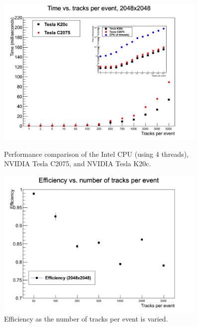 \documentclass{JINST}
\begin{document}
\begin{figure}[!Hhtb]
\begin{minipage}[t]{8.0cm}
\begin{center}
	\includegraphics[width=0.9\textwidth]{figs/TimePerformance.pdf}
	\caption{Performance comparison of the Intel CPU (using 4 threads), NVIDIA Tesla C2075, and NVIDIA Tesla K20c. \label{fig:TimePerformance}}
	\end{center}
\end{minipage}
\begin{minipage}[t]{8.0cm}
\begin{center}
	\includegraphics[width=0.9\textwidth]{figs/Eff.pdf}
	\caption{Efficiency as the number of tracks per event is varied.  \label{fig:Eff}}
	\end{center}
\end{minipage}
\end{figure}
\end{document}
